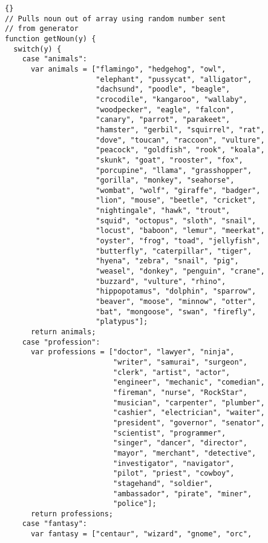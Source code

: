 \documentclass[twoside]{article}
\begin{document}
\begin{lstlisting}{}
// Pulls noun out of array using random number sent 
// from generator
function getNoun(y) {
  switch(y) {
    case "animals": 
      var animals = ["flamingo", "hedgehog", "owl", 
                     "elephant", "pussycat", "alligator", 
                     "dachsund", "poodle", "beagle", 
                     "crocodile", "kangaroo", "wallaby", 
                     "woodpecker", "eagle", "falcon", 
                     "canary", "parrot", "parakeet", 
                     "hamster", "gerbil", "squirrel", "rat",
                     "dove", "toucan", "raccoon", "vulture",
                     "peacock", "goldfish", "rook", "koala",
                     "skunk", "goat", "rooster", "fox",
                     "porcupine", "llama", "grasshopper",
                     "gorilla", "monkey", "seahorse", 
                     "wombat", "wolf", "giraffe", "badger", 
                     "lion", "mouse", "beetle", "cricket", 
                     "nightingale", "hawk", "trout", 
                     "squid", "octopus", "sloth", "snail", 
                     "locust", "baboon", "lemur", "meerkat",
                     "oyster", "frog", "toad", "jellyfish", 
                     "butterfly", "caterpillar", "tiger",
                     "hyena", "zebra", "snail", "pig",
                     "weasel", "donkey", "penguin", "crane",
                     "buzzard", "vulture", "rhino",
                     "hippopotamus", "dolphin", "sparrow",
                     "beaver", "moose", "minnow", "otter",
                     "bat", "mongoose", "swan", "firefly",
                     "platypus"];
      return animals;
    case "profession": 
      var professions = ["doctor", "lawyer", "ninja",
                         "writer", "samurai", "surgeon",
                         "clerk", "artist", "actor",
                         "engineer", "mechanic", "comedian",
                         "fireman", "nurse", "RockStar",
                         "musician", "carpenter", "plumber",
                         "cashier", "electrician", "waiter",
                         "president", "governor", "senator",
                         "scientist", "programmer",
                         "singer", "dancer", "director",
                         "mayor", "merchant", "detective",
                         "investigator", "navigator",
                         "pilot", "priest", "cowboy",
                         "stagehand", "soldier",
                         "ambassador", "pirate", "miner",
                         "police"];
      return professions; 
    case "fantasy": 
      var fantasy = ["centaur", "wizard", "gnome", "orc",

\end{lstlisting}
\end{document}
